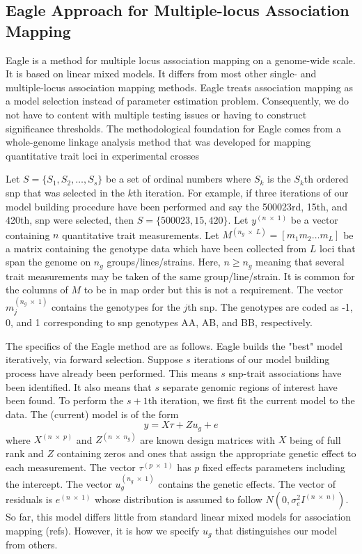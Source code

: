 \documentclass{nature}
\begin{document}
\subsection{Eagle Approach for Multiple-locus Association Mapping}

Eagle is a method for multiple locus association mapping on a genome-wide scale. It is based on linear mixed models. It differs from most other single- and multiple-locus association mapping methods. Eagle treats association mapping as a model selection instead of parameter estimation problem. Consequently,  we do not have to content with multiple testing issues or having to construct significance thresholds. 
The methodological foundation for Eagle comes from a whole-genome linkage analysis method that was developed for mapping 
quantitative trait loci in experimental crosses \cite{verbyla2007analysis} 


Let $S = \{ S_1, S_2, \ldots, S_s\}$ be a set of ordinal numbers where $S_k$ is the $S_k$th ordered snp that was 
selected in the $k$th iteration. For example, if three iterations of our model building procedure 
have been performed and say the 500023rd, 15th, and 420th, 
snp were selected, then $S=\{500023, 15, 420\}$. 
Let $y^{(n \; \times \;1)}$ be a vector containing $n$ quantitative trait measurements. 
Let $M^{(n_g \; \times \; L)} = [m_1 m_2 \ldots m_L]$ be a matrix containing the genotype data which have been collected 
from $L$ loci that span the genome on $n_g$ groups/lines/strains.  Here, $n \geq n_g$ meaning that several trait measurements 
may be taken of the same group/line/strain. 
 It is common for the columns of $M$ to be in map order but this is not a requirement. 
The vector $m_j^{(n_g \; \times \; 1)}$ contains the genotypes for the $j$th snp. 
The genotypes are coded as -1, 0, and 1 corresponding to snp genotypes AA, AB, and BB, respectively. 

The specifics of the Eagle method are as follows. 
Eagle builds the "best" model iteratively, via forward selection. 
Suppose $s$ iterations of our model building process have already been performed. This means $s$ snp-trait 
associations have been identified.  It also means that $s$ separate genomic regions of interest have been found.  
To perform the $s+1$th  iteration, we first fit the current model to the data. 
The (current) model is of the form 
\begin{equation}
\label{eq1}
y = X \tau + Z u_g + e
\end{equation}
where 
$X^{(n \; \times \; p)}$ and $Z^{( n \; \times \; n_g)}$ are known design matrices with $X$ being of full rank and $Z$ 
containing zeros and ones that assign the appropriate genetic effect to each measurement. 
The vector 
$\tau^{(p \; \times \; 1)}$ has $p$ fixed effects parameters including the intercept. The vector 
$u_g^{(n_g \; \times \; 1)}$ contains the 
genetic effects. The vector of residuals is 
$e^{(n \; \times \;1)}$ whose distribution is assumed to follow $N(0, \sigma^2_e I^{(n \; \times \; n)})$. 
So far,  this model differs little from standard linear mixed models for association mapping (refs). 
However, 
it is how we specify $u_g$ that distinguishes our model from others. 
\end{document}
